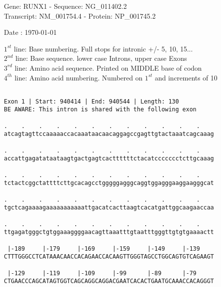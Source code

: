 \documentclass{article}
\begin{document}
\begin{center}
\begin{large}
Gene: RUNX1 - Sequence: NG\_011402.2\\
Transcript: NM\_001754.4 - Protein: NP\_001745.2
 
 Date : \today
\end{large}
\end{center}
$1^{st}$ line: Base numbering. Full stops for intronic +/- 5, 10, 15...\\
$2^{nd}$ line: Base sequence. lower case Introns, upper case Exons\\
$3^{rd}$ line: Amino acid sequence. Printed on MIDDLE base of codon\\
$4^{th}$ line: Amino acid numbering. Numbered on $1^{st}$ and increments of 10\\
 \begin{Verbatim}
 
Exon 1 | Start: 940414 | End: 940544 | Length: 130
BE AWARE: This intron is shared with the following exon
 
.    .    .    .    .    .    .    .    .    .    .    .    
atcagtagttccaaaaaccacaaataacaacaggagccgagttgtactaaatcagcaaag
                                                            
.    .    .    .    .    .    .    .    .    .    .    .    
accattgagatataataagtgactgagtcacttttttctacatccccccctcttgcaaag
                                                            
.    .    .    .    .    .    .    .    .    .    .    .    
tctactcggctattttcttgcacagcctgggggagggcaggtggagggaaggaagggcat
                                                            
.    .    .    .    .    .    .    .    .    .    .    .    
tgctcagaaaagaaaaaaaaaaattgacatcacttaagtcacatgattggcaagaaccaa
                                                            
.    .    .    .    .    .    .    .    .    .    .    .    
ttgagatgggctgtggaaaggggaacagttaaatttgtaatttgggttgtgtgaaaactt
                                                            
 |-189     |-179     |-169     |-159     |-149     |-139    
CTTTGGGCCTCATAAACAACCACAGAACCACAAGTTGGGTAGCCTGGCAGTGTCAGAAGT
                                                            
 |-129     |-119     |-109     |-99      |-89      |-79     
CTGAACCCAGCATAGTGGTCAGCAGGCAGGACGAATCACACTGAATGCAAACCACAGGGT
                                                            

\end{Verbatim}
\end{document}
